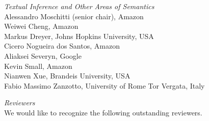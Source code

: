 \emph{Textual Inference and Other Areas of Semantics} \\
\hspace*{0.2in}Alessandro Moschitti (senior chair), Amazon \\
\hspace*{0.2in}Weiwei Cheng, Amazon \\
\hspace*{0.2in}Markus Dreyer, Johns Hopkins University, USA \\
\hspace*{0.2in}Cicero Nogueira dos Santos, Amazon \\
\hspace*{0.2in}Aliaksei Severyn, Google \\
\hspace*{0.2in}Kevin Small, Amazon \\
\hspace*{0.2in}Nianwen Xue, Brandeis University, USA \\
\hspace*{0.2in}Fabio Massimo Zanzotto, University of Rome Tor Vergata, Italy


\emph{Reviewers} \\
\hspace*{0.2in}We would like to recognize the following outstanding reviewers.\\

